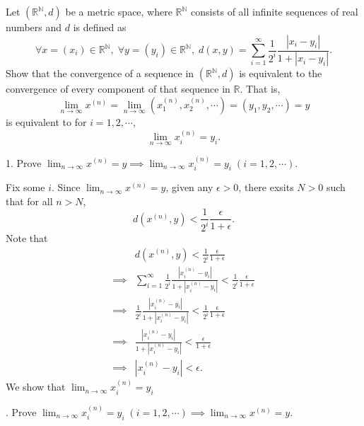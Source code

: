 \documentclass[12pt,letterpaper,boxed]{hmcpset}
\begin{document}
\begin{problem}[1.2]
	Let $(\mathbb{R}^\mathbb{N}, d)$ be a metric space, where $\mathbb{R}^\mathbb{N}$ consists of all infinite sequences of real numbers and $d$ is defined as 
	\[
		\forall x=(x_i)\in\mathbb{R}^\mathbb{N},\;\forall y=(y_i)\in\mathbb{R}^\mathbb{N},\;d(x,y)=\sum_{i=1}^\infty\frac{1}{2^i}\frac{|x_i-y_i|}{1+|x_i-y_i|}.
	\]
	Show that the convergence of a sequence in $(\mathbb{R}^\mathbb{N}, d)$ is equivalent to the convergence of every component of that sequence in $\mathbb{R}$. That is, 
	\[
		\lim_{n\to\infty}x^{(n)}=\lim_{n\to\infty}\left(x_1^{(n)},x_2^{(n)},\cdots\right)=\left(y_1,y_2,\cdots\right)=y
	\]
	is equivalent to for $i=1,2,\cdots$,
	\[
		\lim_{n\to\infty}x_i^{(n)}=y_i.
	\]
\end{problem}
\begin{solution}
	1. Prove $\lim_{n\to\infty}x^{(n)}= y\implies\lim_{n\to\infty}x_i^{(n)}=y_i\;(i=1,2,\cdots) $. 
		
	Fix some $i$. Since $\lim_{n\to\infty}x^{(n)}=y$, given any $\epsilon>0$, there exsits $N>0$ such that for all $n>N$,
	\[
		d\left(x^{(n)},y\right)<\frac{1}{2^i}\frac{\epsilon}{1+\epsilon}.
	\]
	Note that
	\begin{align*}
		&d\left(x^{(n)},y\right)<\frac{1}{2^i}\frac{\epsilon}{1+\epsilon}\\
		\implies &\sum_{i=1}^\infty\frac{1}{2^i}\frac{\left|x_i^{(n)}-y_i\right|}{1+\left|x_i^{(n)}-y_i\right|}<\frac{1}{2^i}\frac{\epsilon}{1+\epsilon}\\
		\implies &\frac{1}{2^i}\frac{\left|x_i^{(n)}-y_i\right|}{1+\left|x_i^{(n)}-y_i\right|}<\frac{1}{2^i}\frac{\epsilon}{1+\epsilon}\\
		\implies &\frac{\left|x_i^{(n)}-y_i\right|}{1+\left|x_i^{(n)}-y_i\right|}<\frac{\epsilon}{1+\epsilon}\\
		\implies &\left|x_i^{(n)}-y_i\right|<\epsilon.
	\end{align*}
	We show that $\lim_{n\to\infty}x_i^{(n)}=y_i$

	. Prove $\lim_{n\to\infty}x_i^{(n)}=y_i\;(i=1,2,\cdots)\implies\lim_{n\to\infty}x^{(n)}= y$. 


\end{solution}
\end{document}
